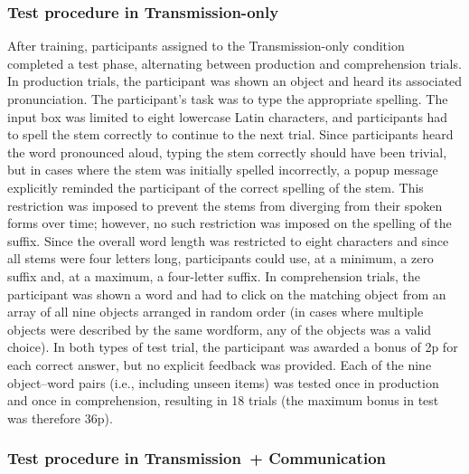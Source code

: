 \documentclass[doc,biblatex]{apa7}
\begin{document}
\subsubsection{Test procedure in Transmission-only}

After training, participants assigned to the Transmission-only condition completed a test phase, alternating between production and comprehension trials. In production trials, the participant was shown an object and heard its associated pronunciation. The participant's task was to type the appropriate spelling. The input box was limited to eight lowercase Latin characters, and participants had to spell the stem correctly to continue to the next trial. Since participants heard the word pronounced aloud, typing the stem correctly should have been trivial, but in cases where the stem was initially spelled incorrectly, a popup message explicitly reminded the participant of the correct spelling of the stem. This restriction was imposed to prevent the stems from diverging from their spoken forms over time; however, no such restriction was imposed on the spelling of the suffix. Since the overall word length was restricted to eight characters and since all stems were four letters long, participants could use, at a minimum, a zero suffix and, at a maximum, a four-letter suffix. In comprehension trials, the participant was shown a word and had to click on the matching object from an array of all nine objects arranged in random order (in cases where multiple objects were described by the same wordform, any of the objects was a valid choice). In both types of test trial, the participant was awarded a bonus of 2p for each correct answer, but no explicit feedback was provided. Each of the nine object--word pairs (i.e., including unseen items) was tested once in production and once in comprehension, resulting in 18 trials (the maximum bonus in test was therefore 36p).

\subsubsection{Test procedure in Transmission~+ Communication}
\end{document}
